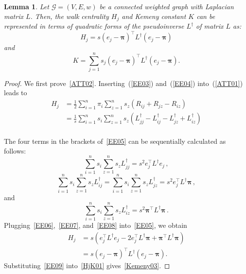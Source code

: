 \documentclass[sigconf]{acmart}
\newtheorem{lemma}[theorem]{Lemma}
\def\calG{\mathcal{G}}
\newcommand\ppi{\boldsymbol{\pi}}
\newcommand\ee{\boldsymbol{\mathit{e}}}
\newcommand\LL{\boldsymbol{\mathit{L}}}
\begin{document}
\begin{lemma}
	\label{HjK} Let $\calG=(V,E,w)$ be a connected weighted graph  with  Laplacian matrix $\LL$. Then, the walk centrality $H_j$ and Kemeny constant $K$ can be represented  in terms of quadratic forms of the pseudoinverse $\LL^{\dagger}$  of   matrix  $\LL$ as:
	\begin{equation}\label{ATT02}
		H_j=s(\ee_j - \ppi)^{\top} \LL^{\dagger} (\ee_j - \ppi)
	\end{equation}
	and
	\begin{equation}\label{Kemeny03}
		K= \sum_{j=1}^{n} s_j (\ee_j - \ppi)^{\top} \LL^{\dagger} (\ee_j - \ppi).
	\end{equation}
\end{lemma}
\begin{proof}
	We first prove~\eqref{ATT02}. Inserting~(\ref{EE03}) and~(\ref{EE04}) into~(\ref{ATT01}) leads to
	\begin{equation}\label{EE05}
		\begin{split}
			H_j&=\frac{1}{2} \sum_{i=1}^{n} \pi_i \sum_{z=1}^{n} s_z(R_{ij}+R_{jz}-R_{iz}) \\
			&=\frac{1}{s} \sum_{i=1}^{n} s_i \sum_{z=1}^{n} s_z \left({\LL}_{jj}^{\dagger}-{\LL}_{ij}^{\dagger}-{\LL}_{jz}^{\dagger}+{\LL}_{iz}^{\dagger}\right) \\
		\end{split}
	\end{equation}

	The  four terms in the brackets of~\eqref{EE05}  can be sequentially calculated as follows:
	\begin{equation}\label{EE06}
		\sum_{i=1}^{n} s_i \sum_{z=1}^{n} s_z {\LL}_{jj}^{\dagger}=s^2 \ee_j^{\top} \LL^{\dagger} \ee_j\,,
	\end{equation}
	\begin{equation}\label{EE07}
		\sum_{i=1}^{n} s_i \sum_{z=1}^{n} s_z {\LL}_{ij}^{\dagger}=\sum_{i=1}^{n} s_i \sum_{z=1}^{n} s_z {\LL}_{jz}^{\dagger}=s^2 \ee_j^{\top} \LL^{\dagger} \ppi\,,
	\end{equation}
	and
	\begin{equation}\label{EE08}
		\sum_{i=1}^{n} s_i  \sum_{z=1}^{n} s_z {\LL}_{iz}^{\dagger}=s^2 \ppi^{\top} \LL^{\dagger} \ppi \,.
	\end{equation}
	Plugging~\eqref{EE06},~\eqref{EE07}, and~\eqref{EE08}  into~\eqref{EE05}, we obtain
	\begin{equation}\label{EE09}
		\begin{split}
			H_j&=s(\ee_j^{\top} \LL^{\dagger} \ee_j - 2 \ee_j^{\top} \LL^{\dagger} \ppi + \ppi^{\top} \LL^{\dagger} \ppi) \\
			&=s(\ee_j - \ppi)^{\top} \LL^{\dagger} (\ee_j - \ppi).
		\end{split}
	\end{equation}
	Substituting~\eqref{EE09}  into~\eqref{HjK01} gives~\eqref{Kemeny03}.
\end{proof}
\end{document}
